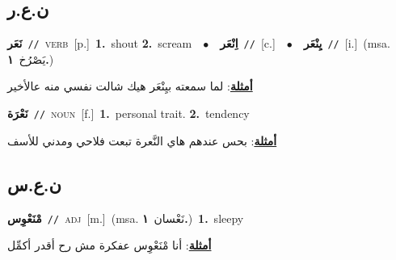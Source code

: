 \documentclass[10pt,a4paper,twoside]{article} %
\begin{document}
\begin{multicols}{2}
\vspace{-3mm}
\subsection*{\color{blue}\foreignlanguage{arabic}{ن.ع.ر}\color{blue}{}} 

{\setlength\topsep{0pt}\textbf{\foreignlanguage{arabic}{نَعَر}}\ {\color{gray}\texttt{//}\color{black}}\ \textsc{verb}\ [p.]\ \textbf{1.}~shout  \textbf{2.}~scream\ \ $\bullet$\ \ \setlength\topsep{0pt}\textbf{\foreignlanguage{arabic}{اِنْعَر}}\ {\color{gray}\texttt{//}\color{black}}\ [c.]\ \ $\bullet$\ \ \setlength\topsep{0pt}\textbf{\foreignlanguage{arabic}{يِنْعَر}}\ {\color{gray}\texttt{//}\color{black}}\ [i.]\ \color{gray}(msa. \foreignlanguage{arabic}{يَصْرُخ}~\foreignlanguage{arabic}{\textbf{١.}})\color{black}\  \begin{flushright}\color{gray}\foreignlanguage{arabic}{\textbf{\underline{\foreignlanguage{arabic}{أمثلة}}}: لما سمعته بيِنْعَر هيك شالت نفسي منه عالأخير}\end{flushright}\color{black}} \vspace{2mm}

{\setlength\topsep{0pt}\textbf{\foreignlanguage{arabic}{نَعْرَة}}\ {\color{gray}\texttt{//}\color{black}}\ \textsc{noun}\ [f.]\ \textbf{1.}~personal trait.  \textbf{2.}~tendency\  \begin{flushright}\color{gray}\foreignlanguage{arabic}{\textbf{\underline{\foreignlanguage{arabic}{أمثلة}}}: بحس عندهم هاي النَّعرة تبعت فلاحي ومدني للأسف}\end{flushright}\color{black}} \vspace{2mm}

\vspace{-3mm}
\subsection*{\color{blue}\foreignlanguage{arabic}{ن.ع.س}\color{blue}{}} 

{\setlength\topsep{0pt}\textbf{\foreignlanguage{arabic}{مْنَعْوِس}}\ {\color{gray}\texttt{//}\color{black}}\ \textsc{adj}\ [m.]\ \color{gray}(msa. \foreignlanguage{arabic}{نَعْسان}~\foreignlanguage{arabic}{\textbf{١.}})\color{black}\ \textbf{1.}~sleepy\  \begin{flushright}\color{gray}\foreignlanguage{arabic}{\textbf{\underline{\foreignlanguage{arabic}{أمثلة}}}: أنا مْنَعْوِس عفكرة مش رح أقدر أكمِّل}\end{flushright}\color{black}} \vspace{2mm}


\end{multicols}
\end{document}

